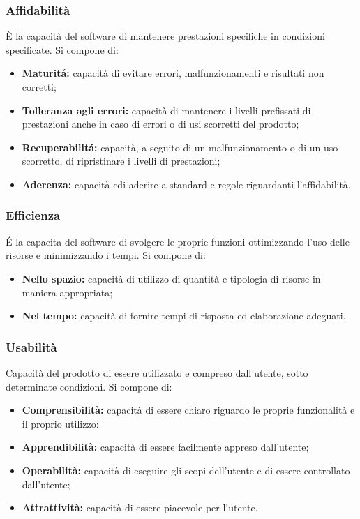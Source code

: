 \subsubsection{Affidabilit\`a}
\`E la capacit\`a del software di mantenere prestazioni specifiche in condizioni specificate.
Si compone di:
\begin{itemize}
    \item \textbf{Maturit\'a: }capacit\`a di evitare errori, malfunzionamenti e risultati non corretti;
    \item \textbf{Tolleranza agli errori: }capacit\`a di mantenere i livelli prefissati di prestazioni anche in caso di errori o di usi scorretti del prodotto;
    \item \textbf{Recuperabilit\'a: }capacit\`a, a seguito di un malfunzionamento o di un uso scorretto, di ripristinare i livelli di prestazioni;
    \item \textbf{Aderenza: }capacit\`a cdi aderire a standard e regole riguardanti l'affidabilit\`a.
\end{itemize}
\subsubsection{Efficienza}
\'E la capacita del software di svolgere le proprie funzioni ottimizzando l'uso delle risorse e minimizzando i tempi. Si compone di:
\begin{itemize}
    \item  \textbf{Nello spazio: }capacit\`a di utilizzo di quantit\`a e tipologia di risorse in maniera appropriata;
    \item  \textbf{Nel tempo: }capacit\`a di fornire tempi di risposta ed elaborazione adeguati.
\end{itemize}
\subsubsection{Usabilit\`a}
Capacit\`a del prodotto di essere utilizzato e compreso dall'utente, sotto determinate condizioni. Si compone di:
\begin{itemize}
    \item \textbf{Comprensibilit\`a: }capacit\`a di essere chiaro riguardo le proprie funzionalit\`a e il proprio utilizzo:
    \item \textbf{Apprendibilit\`a: }capacit\`a di essere facilmente appreso dall'utente;
    \item \textbf{Operabilit\`a: }capacit\`a di eseguire gli scopi dell'utente e di essere controllato dall'utente;
    \item \textbf{Attrattivit\`a: }capacit\`a di essere piacevole per l'utente.
\end{itemize}
